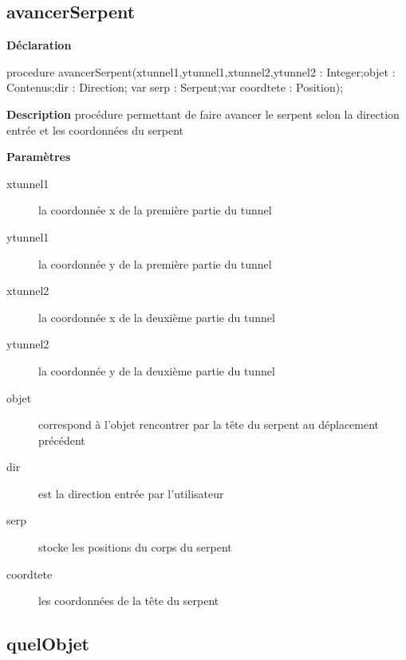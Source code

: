 \documentclass{report}
\newif\ifpdf
\begin{document}
\subsection*{avancerSerpent}
\fi
\label{Deplacement-avancerSerpent}
\begin{list}{}{
\setlength{\itemindent}{0cm}
\setlength{\listparindent}{0cm}
\setlength{\leftmargin}{\evensidemargin}
\addtolength{\leftmargin}{\tmplength}
\settowidth{\labelsep}{X}
\addtolength{\leftmargin}{\labelsep}
\setlength{\labelwidth}{\tmplength}
}
\item[\textbf{Déclaration}\hfill]
\ifpdf
\begin{flushleft}
\fi
\begin{ttfamily}
procedure avancerSerpent(xtunnel1,ytunnel1,xtunnel2,ytunnel2 : Integer;objet : Contenus;dir : Direction; var serp : Serpent;var coordtete : Position);\end{ttfamily}

\ifpdf
\end{flushleft}
\fi

\par
\item[\textbf{Description}]
procédure permettant de faire avancer le serpent selon la direction entrée et les coordonnées du serpent        \par
\item[\textbf{Paramètres}]
\begin{description}
\item[xtunnel1] la coordonnée x de la première partie du tunnel
\item[ytunnel1] la coordonnée y de la première partie du tunnel
\item[xtunnel2] la coordonnée x de la deuxième partie du tunnel
\item[ytunnel2] la coordonnée y de la deuxième partie du tunnel
\item[objet] correspond à l'objet rencontrer par la tête du serpent au déplacement précédent
\item[dir] est la direction entrée par l'utilisateur
\item[serp] stocke les positions du corps du serpent
\item[coordtete] les coordonnées de la tête du serpent
\end{description}


\end{list}
\ifpdf
\subsection*{\large{\textbf{quelObjet}}\normalsize\hspace{1ex}\hrulefill}
\else
\end{document}

